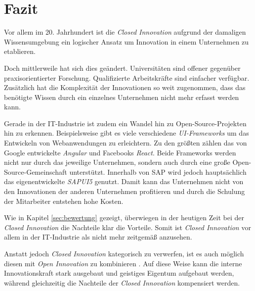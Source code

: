 \section{Fazit}\label{sec:fazit}
Vor allem im 20. Jahrhundert ist die \textit{Closed Innovation}
aufgrund der damaligen Wissensumgebung
ein logischer Ansatz um Innovation in einem Unternehmen zu etablieren.

Doch mittlerweile hat sich dies geändert.
Universitäten sind offener gegenüber praxisorientierter Forschung.
Qualifizierte Arbeitskräfte sind einfacher verfügbar.
Zusätzlich hat die Komplexität der Innovationen so weit zugenommen,
dass das benötigte Wissen durch ein einzelnes Unternehmen nicht mehr erfasst werden kann.

Gerade in der IT-Industrie ist zudem ein Wandel hin zu Open-Source-Projekten hin zu erkennen.
Beispielsweise gibt es viele verschiedene \linebreak{}\textit{UI-Frameworks} um das Entwickeln von Webanwendungen zu erleichtern.
Zu den größten zählen das von Google entwickelte \textit{Angular} und Facebooks \textit{React}.
Beide Frameworks werden nicht nur durch das jeweilige Unternehmen,
sondern auch durch eine große Open-Source-Gemeinschaft unterstützt.
Innerhalb von SAP wird jedoch hauptsächlich das eigenentwickelte \textit{SAPUI5} genutzt.
Damit kann das Unternehmen nicht von den Innovationen der anderen Unternehmen profitieren und
durch die Schulung der Mitarbeiter entstehen hohe Kosten.

Wie in Kapitel \ref{sec:bewertung} gezeigt, überwiegen in der heutigen Zeit bei der \textit{Closed Innovation}
die Nachteile klar die Vorteile.
Somit ist \textit{Closed Innovation} vor allem in der IT-Industrie als nicht mehr zeitgemäß anzusehen.

Anstatt jedoch \textit{Closed Innovation} kategorisch zu verwerfen,
ist es auch möglich diesen mit \textit{Open Innovation} zu kombinieren \cite{OpenInno32:online}.
Auf diese Weise kann die interne Innovationskraft stark ausgebaut und geistiges Eigentum aufgebaut werden,
während gleichzeitig die Nachteile der \textit{Closed Innovation} kompensiert werden.

